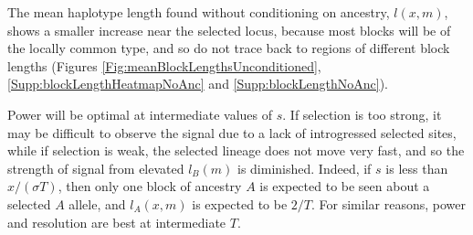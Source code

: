 \documentclass[11pt,letterpaper]{article}
\begin{document}
The mean haplotype length found without conditioning on ancestry, $l(x,m)$,
shows a smaller increase near the selected locus, because most blocks will be of the locally common type, and so do not trace back to regions of different block lengths (Figures \ref{Fig:meanBlockLengthsUnconditioned}, \ref{Supp:blockLengthHeatmapNoAnc} and \ref{Supp:blockLengthNoAnc}).

Power will be optimal at intermediate values of $s$.
If selection is too strong, it may be difficult to observe the signal
due to a lack of introgressed selected sites,
while if selection is weak, the selected lineage does not move very fast,
and so the strength of signal from elevated $l_B(m)$ is diminished. 
Indeed, if $s$ is less than $x/(\sigma T)$, then only one block of ancestry $A$ is expected to be seen about a selected $A$ allele,
and $l_A(x,m)$ is expected to be $2/T$.
For similar reasons, power and resolution are best at intermediate $T$.

\end{document}
